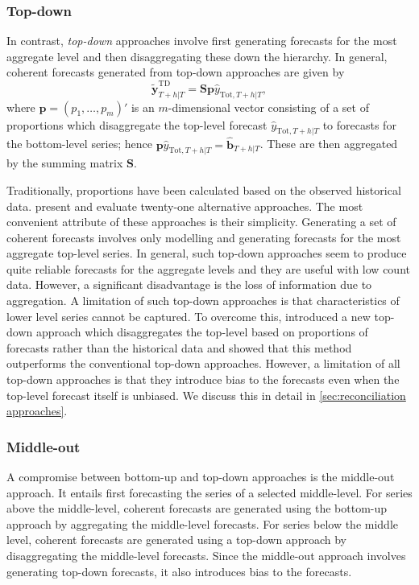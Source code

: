 {\subsubsection{Top-down}

In contrast, \textit{top-down} approaches involve first generating forecasts for the most aggregate level and then disaggregating these down the hierarchy. In general, coherent forecasts generated from top-down approaches are given by
\begin{equation*}
	\tilde{\bm{y}}^{\text{TD}}_{T+h|T}=\bm{S}\bm{p}\hat{y}_{\text{Tot}, T+h|T},
\end{equation*}
where $\bm{p} = (p_1,\dots,p_m)'$ is an $m$-dimensional vector consisting of a set of proportions which disaggregate the top-level forecast $\hat{y}_{\text{Tot}, T+h|T}$ to forecasts for the bottom-level series; hence $\bm{p}\hat{y}_{\text{Tot}, T+h|T}=\bm{\hat{\bm{b}}}_{T+h|T}$. These are then aggregated by the summing matrix $\bm{S}$.

Traditionally, proportions have been calculated based on the observed historical data. \citet{gross1990} present and evaluate twenty-one alternative approaches. The most convenient attribute of these approaches is their simplicity. Generating a set of coherent forecasts involves only modelling and generating forecasts for the most aggregate top-level series. In general, such top-down approaches seem to produce quite reliable forecasts for the aggregate levels and they are useful with low count data. However, a significant disadvantage is the loss of information due to aggregation. A limitation of such top-down approaches is that characteristics of lower level series cannot be captured. To overcome this, \citet{AthEtAl2009} introduced a new top-down approach which disaggregates the top-level based on proportions of forecasts rather than the historical data and showed that this method outperforms the conventional top-down approaches. However, a limitation of all top-down approaches is that they introduce bias to the forecasts even when the top-level forecast itself is unbiased. We discuss this in detail in \ref{sec:reconciliation approaches}.

\subsubsection{Middle-out}

A compromise between bottom-up and top-down approaches is the middle-out approach. It entails first forecasting the series of a selected middle-level. For series above the middle-level, coherent forecasts are generated using the bottom-up approach by aggregating the middle-level forecasts. For series below the middle level, coherent forecasts are generated using a top-down approach by disaggregating the middle-level forecasts. Since the middle-out approach involves generating top-down forecasts, it also introduces bias to the forecasts.

}
